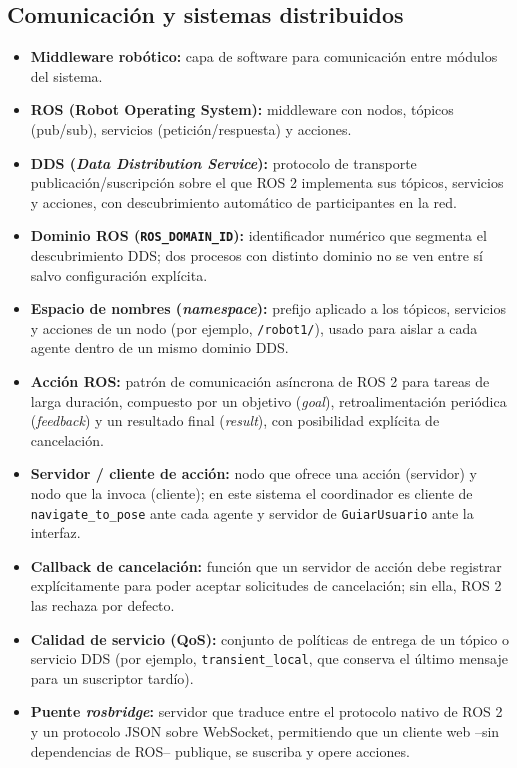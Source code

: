 \documentclass[12pt,letterpaper]{article}
\begin{document}
\subsection{Comunicación y sistemas distribuidos}
\begin{itemize}[leftmargin=*]
    \item \textbf{Middleware robótico:} capa de software para comunicación entre módulos del sistema.
    \item \textbf{ROS (Robot Operating System):} middleware con nodos, tópicos (pub/sub), servicios (petición/respuesta) y acciones.
    \item \textbf{DDS (\textit{Data Distribution Service}):} protocolo de transporte publicación/suscripción sobre el que ROS 2 implementa sus tópicos, servicios y acciones, con descubrimiento automático de participantes en la red.
    \item \textbf{Dominio ROS (\texttt{ROS\_DOMAIN\_ID}):} identificador numérico que segmenta el descubrimiento DDS; dos procesos con distinto dominio no se ven entre sí salvo configuración explícita.
    \item \textbf{Espacio de nombres (\textit{namespace}):} prefijo aplicado a los tópicos, servicios y acciones de un nodo (por ejemplo, \texttt{/robot1/}), usado para aislar a cada agente dentro de un mismo dominio DDS.
    \item \textbf{Acción ROS:} patrón de comunicación asíncrona de ROS 2 para tareas de larga duración, compuesto por un objetivo (\textit{goal}), retroalimentación periódica (\textit{feedback}) y un resultado final (\textit{result}), con posibilidad explícita de cancelación.
    \item \textbf{Servidor / cliente de acción:} nodo que ofrece una acción (servidor) y nodo que la invoca (cliente); en este sistema el coordinador es cliente de \texttt{navigate\_to\_pose} ante cada agente y servidor de \texttt{GuiarUsuario} ante la interfaz.
    \item \textbf{Callback de cancelación:} función que un servidor de acción debe registrar explícitamente para poder aceptar solicitudes de cancelación; sin ella, ROS 2 las rechaza por defecto.
    \item \textbf{Calidad de servicio (QoS):} conjunto de políticas de entrega de un tópico o servicio DDS (por ejemplo, \texttt{transient\_local}, que conserva el último mensaje para un suscriptor tardío).
    \item \textbf{Puente \textit{rosbridge}:} servidor que traduce entre el protocolo nativo de ROS 2 y un protocolo JSON sobre WebSocket, permitiendo que un cliente web --sin dependencias de ROS-- publique, se suscriba y opere acciones.
\end{itemize}
\end{document}
